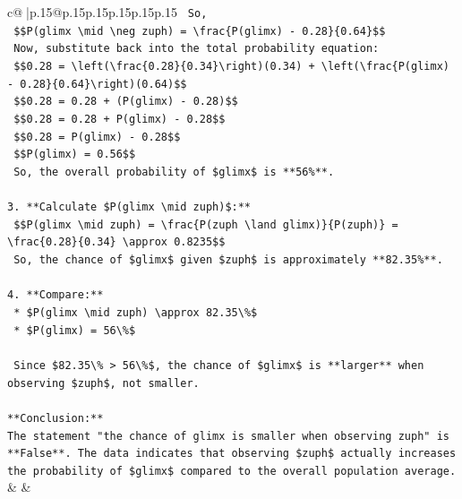 \documentclass{article}
\begin{document}
{\begin{supertabular}{c@{$\;$}|p{.15\linewidth}@{}p{.15\linewidth}p{.15\linewidth}p{.15\linewidth}p{.15\linewidth}p{.15\linewidth}}
{{{\texttt{    So,} \\
\texttt{    \$\$P(glimx \textbackslash{}mid \textbackslash{}neg zuph) = \textbackslash{}frac\{P(glimx) {-} 0.28\}\{0.64\}\$\$} \\
\texttt{    Now, substitute back into the total probability equation:} \\
\texttt{    \$\$0.28 = \textbackslash{}left(\textbackslash{}frac\{0.28\}\{0.34\}\textbackslash{}right)(0.34) + \textbackslash{}left(\textbackslash{}frac\{P(glimx) {-} 0.28\}\{0.64\}\textbackslash{}right)(0.64)\$\$} \\
\texttt{    \$\$0.28 = 0.28 + (P(glimx) {-} 0.28)\$\$} \\
\texttt{    \$\$0.28 = 0.28 + P(glimx) {-} 0.28\$\$} \\
\texttt{    \$\$0.28 = P(glimx) {-} 0.28\$\$} \\
\texttt{    \$\$P(glimx) = 0.56\$\$} \\
\texttt{    So, the overall probability of \$glimx\$ is **56\%**.} \\
\\ 
\texttt{3.  **Calculate \$P(glimx \textbackslash{}mid zuph)\$:**} \\
\texttt{    \$\$P(glimx \textbackslash{}mid zuph) = \textbackslash{}frac\{P(zuph \textbackslash{}land glimx)\}\{P(zuph)\} = \textbackslash{}frac\{0.28\}\{0.34\} \textbackslash{}approx 0.8235\$\$} \\
\texttt{    So, the chance of \$glimx\$ given \$zuph\$ is approximately **82.35\%**.} \\
\\ 
\texttt{4.  **Compare:**} \\
\texttt{    *   \$P(glimx \textbackslash{}mid zuph) \textbackslash{}approx 82.35\textbackslash{}\%\$} \\
\texttt{    *   \$P(glimx) = 56\textbackslash{}\%\$} \\
\\ 
\texttt{    Since \$82.35\textbackslash{}\% > 56\textbackslash{}\%\$, the chance of \$glimx\$ is **larger** when observing \$zuph\$, not smaller.} \\
\\ 
\texttt{**Conclusion:**} \\
\texttt{The statement "the chance of glimx is smaller when observing zuph" is **False**. The data indicates that observing \$zuph\$ actually increases the probability of \$glimx\$ compared to the overall population average.} \\
            }
        }
    }
    & & \\ \\


\end{supertabular}}
\end{document}

